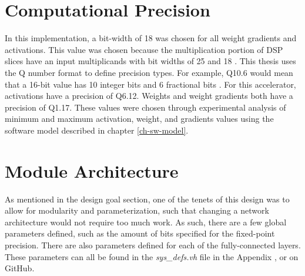 \section{Computational Precision}
In this implementation, a bit-width of 18 was chosen for all weight gradients and activations. This value was chosen because the multiplication portion of DSP slices have an input multiplicands with bit widths of 25 and 18 . This thesis uses the Q number format to define precision types. For example, Q10.6 would mean that a 16-bit value has 10 integer bits and 6 fractional bits \cite{q-format}. For this accelerator, activations have a precision of Q6.12. Weights and weight gradients both have a precision of Q1.17. These values were chosen through experimental analysis of minimum and maximum activation, weight, and gradients values using the software model described in chapter \ref{ch-sw-model}.

\section{Module Architecture}
As mentioned in the design goal section, one of the tenets of this design was to allow for modularity and parameterization, such that changing a network architecture would not require too much work. As such, there are a few global parameters defined, such as the amount of bits specified for the fixed-point precision. There are also parameters defined for each of the fully-connected layers. These parameters can all be found in the \textit{sys\_defs.vh} file in the Appendix , or on GitHub. 

